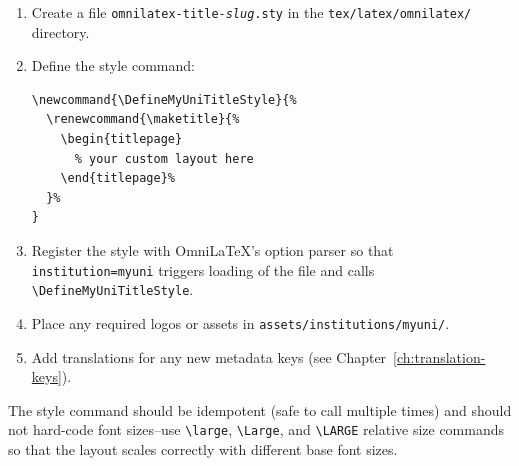 \begin{enumerate}
  \item Create a file \texttt{omnilatex-title-\textit{slug}.sty} in the
        \texttt{tex/latex/omnilatex/} directory.
  \item Define the style command:
        \begin{verbatim}
\newcommand{\DefineMyUniTitleStyle}{%
  \renewcommand{\maketitle}{%
    \begin{titlepage}
      % your custom layout here
    \end{titlepage}%
  }%
}
        \end{verbatim}
  \item Register the style with OmniLaTeX's option parser so that
        \texttt{institution=myuni} triggers loading of the file and calls
        \verb|\DefineMyUniTitleStyle|.
  \item Place any required logos or assets in
        \texttt{assets/institutions/myuni/}.
  \item Add translations for any new metadata keys (see
        Chapter~\ref{ch:translation-keys}).
\end{enumerate}

The style command should be idempotent (safe to call multiple times) and
should not hard-code font sizes--use \verb|\large|, \verb|\Large|, and
\verb|\LARGE| relative size commands so that the layout scales correctly
with different base font sizes.
